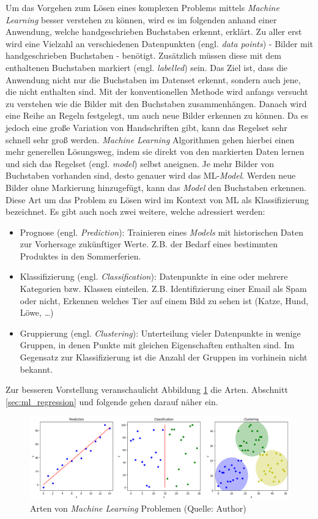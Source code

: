 Um das Vorgehen zum Lösen eines komplexen Problems mittels \textit{Machine Learning} besser verstehen zu können, wird es im folgenden anhand einer Anwendung, welche handgeschrieben Buchstaben erkennt, erklärt. Zu aller erst wird eine Vielzahl an verschiedenen Datenpunkten (engl. \textit{data points}) - Bilder mit handgeschrieben Buchstaben - benötigt. Zusätzlich müssen diese mit dem enthaltenen Buchstaben markiert (engl. \textit{labelled}) sein. Das Ziel ist, dass die Anwendung nicht nur die Buchstaben im Datenset erkennt, sondern auch jene, die nicht enthalten sind. Mit der konventionellen Methode wird anfangs versucht zu verstehen wie die Bilder mit den Buchstaben zusammenhängen. Danach wird eine Reihe an Regeln festgelegt, um auch neue Bilder erkennen zu können. Da es jedoch eine große Variation von Handschriften gibt, kann das Regelset sehr schnell sehr groß werden. \textit{Machine Learning} Algorithmen gehen hierbei einen mehr generellen Lösungsweg, indem sie direkt von den markierten Daten lernen und sich das Regelset (engl. \textit{model}) selbst aneignen. Je mehr Bilder von Buchstaben vorhanden sind, desto genauer wird das ML-\textit{Model}. Werden neue Bilder ohne Markierung hinzugefügt, kann das \textit{Model} den Buchstaben erkennen. Diese Art um das Problem zu Lösen wird im Kontext von ML als Klassifizierung bezeichnet. Es gibt auch noch zwei weitere, welche adressiert werden:
\begin{itemize}
  \item Prognose (engl. \textit{Prediction}): Trainieren eines \textit{Models} mit historischen Daten zur Vorhersage zukünftiger Werte. Z.B. der Bedarf eines bestimmten Produktes in den Sommerferien.
  \item Klassifizierung (engl. \textit{Classification}): Datenpunkte in eine oder mehrere Kategorien bzw. Klassen einteilen. Z.B. Identifizierung einer Email als Spam oder nicht, Erkennen welches Tier auf einem Bild zu sehen ist (Katze, Hund, Löwe, \dots)
  \item Gruppierung (engl. \textit{Clustering}): Unterteilung vieler Datenpunkte in wenige Gruppen, in denen Punkte mit gleichen Eigenschaften enthalten sind. Im Gegensatz zur Klassifizierung ist die Anzahl der Gruppen im vorhinein nicht bekannt.
\end{itemize}

Zur besseren Vorstellung veranschaulicht Abbildung \ref{fig:ml_problem_types} die Arten. Abschnitt \ref{sec:ml_regression} und folgende gehen darauf näher ein.

\begin{figure}[htbp]
	\centering
		\includegraphics[width=\textwidth]{images/ml_problem_types.png}
	\caption{Arten von \textit{Machine Learning} Problemen (Quelle: Author)}
	\label{fig:ml_problem_types}
\end{figure}


